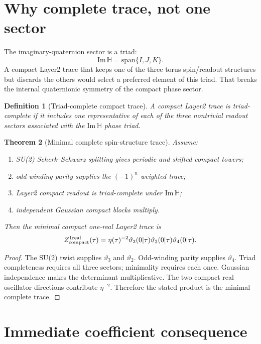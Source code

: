 \documentclass[12pt,a4paper]{article}
\newtheorem{definition}{Definition}[section]
\newtheorem{theorem}[definition]{Theorem}
\begin{document}
\section{Why complete trace, not one sector}

The imaginary-quaternion sector is a triad:
\[
  \mathrm{Im}\,\mathbb H=\mathrm{span}\{I,J,K\}.
\]
A compact Layer2 trace that keeps one of the three torus spin/readout structures
but discards the others would select a preferred element of this triad.  That
breaks the internal quaternionic symmetry of the compact phase sector.

\begin{definition}[Triad-complete compact trace]
A compact Layer2 trace is triad-complete if it includes one representative of
each of the three nontrivial readout sectors associated with the
$\mathrm{Im}\,\mathbb H$ phase triad.
\end{definition}

\begin{theorem}[Minimal complete spin-structure trace]
Assume:
\begin{enumerate}
\item SU(2) Scherk--Schwarz splitting gives periodic and shifted compact towers;
\item odd-winding parity supplies the $(-1)^n$ weighted trace;
\item Layer2 compact readout is triad-complete under $\mathrm{Im}\,\mathbb H$;
\item independent Gaussian compact blocks multiply.
\end{enumerate}
Then the minimal compact one-real Layer2 trace is
\[
  Z_{\rm compact}^{1\rm real}(\tau)
  =\eta(\tau)^{-2}\vartheta_2(0|\tau)\vartheta_3(0|\tau)\vartheta_4(0|\tau).
\]
\end{theorem}

\begin{proof}
The SU(2) twist supplies $\vartheta_3$ and $\vartheta_2$.  Odd-winding parity
supplies $\vartheta_4$.  Triad completeness requires all three sectors; minimality
requires each once.  Gaussian independence makes the determinant multiplicative.
The two compact real oscillator directions contribute $\eta^{-2}$.  Therefore
the stated product is the minimal complete trace.
\end{proof}

\section{Immediate coefficient consequence}
\end{document}
